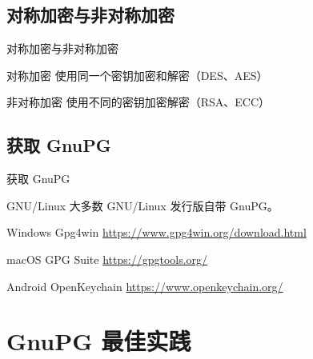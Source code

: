 \documentclass{beamer}
\begin{document}
		\subsection{对称加密与非对称加密}
			\begin{frame}{对称加密与非对称加密}
				\begin{block}{对称加密}
					使用同一个密钥加密和解密（DES、AES）
				\end{block}
				\begin{block}{非对称加密}
					使用不同的密钥加密解密（RSA、ECC）
				\end{block}
			\end{frame}
		\subsection{获取 GnuPG}
			\begin{frame}{获取 GnuPG}
				\begin{block}{GNU/Linux}
					大多数 GNU/Linux 发行版自带 GnuPG。
				\end{block}
				\begin{block}{Windows}
					Gpg4win \href{https://www.gpg4win.org/download.html}{https://www.gpg4win.org/download.html}
				\end{block}
				\begin{block}{macOS}
					GPG Suite \href{https://gpgtools.org/}{https://gpgtools.org/}
				\end{block}
				\begin{block}{Android}
					OpenKeychain \href{https://www.openkeychain.org/}{https://www.openkeychain.org/}
				\end{block}
			\end{frame}
	\section{GnuPG 最佳实践}
\end{document}
